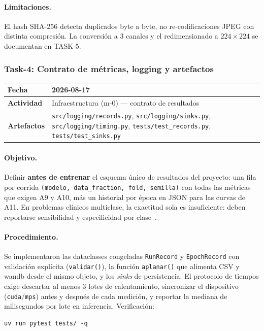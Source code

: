 \paragraph{Limitaciones.}
El hash SHA-256 detecta duplicados byte a byte, no re-codificaciones JPEG con distinta
compresión. La conversión a 3 canales y el redimensionado a $224\times224$ se
documentan en TASK-5.

\subsubsection{Task-4: Contrato de métricas, logging y artefactos}
\label{hallazgo:task-4}
\begin{tabularx}{\textwidth}{|l|X|}\hline
\textbf{Fecha} & 2026-08-17 \\\hline
\textbf{Actividad} & Infraestructura (m-0) --- contrato de resultados \\\hline
\textbf{Artefactos} & \texttt{src/logging/records.py}, \texttt{src/logging/sinks.py}, \texttt{src/logging/timing.py}, \texttt{tests/test\_records.py}, \texttt{tests/test\_sinks.py} \\\hline
\end{tabularx}

\paragraph{Objetivo.}
Definir \textbf{antes de entrenar} el esquema único de resultados del proyecto: una fila
por corrida \texttt{(modelo, data\_fraction, fold, semilla)} con todas las métricas que
exigen A9 y A10, más un historial por época en JSON para las curvas de A11. En problemas
clínicos multiclase, la exactitud sola es insuficiente: deben reportarse sensibilidad y
especificidad por clase~\cite{esteva2019guide}.

\paragraph{Procedimiento.}
Se implementaron las dataclasses congeladas \texttt{RunRecord} y \texttt{EpochRecord} con
validación explícita (\texttt{validar()}), la función \texttt{aplanar()} que alimenta CSV
y wandb desde el mismo objeto, y los \textit{sinks} de persistencia. El protocolo de
tiempos exige descartar al menos 3 lotes de calentamiento, sincronizar el dispositivo
(\texttt{cuda}/\texttt{mps}) antes y después de cada medición, y reportar la mediana de
milisegundos por lote en inferencia. Verificación:
\begin{verbatim}
uv run pytest tests/ -q
\end{verbatim}

